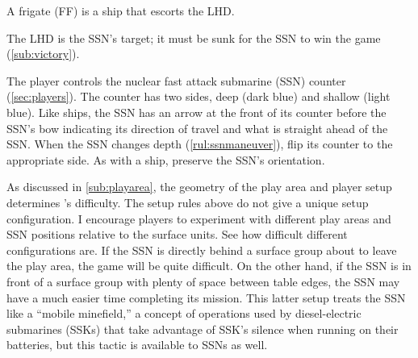 \documentclass[../TacSubMicroRules.tex]{subfiles}
\begin{document}
 A frigate (FF) is a ship that escorts the LHD.

 The LHD is the SSN's target; it must be sunk for the SSN to win the game (\ref{sub:victory}).

 The player controls the nuclear fast attack submarine (SSN) counter (\ref{sec:players}).
The counter has two sides, deep (dark blue) and shallow (light blue).
Like ships, the SSN has an arrow at the front of its counter before the SSN's bow indicating its direction of travel and what is straight ahead of the SSN.
When the SSN changes depth (\ref{rul:ssnmaneuver}), flip its counter to the appropriate side.
As with a ship, preserve the SSN's orientation.

\begin{design}
    As discussed in \ref{sub:playarea}, the geometry of the play area and player setup determines \gametitle's difficulty.
    The setup rules above do not give a unique setup configuration.
    I encourage players to experiment with different play areas and SSN positions relative to the surface units.
    See how difficult different configurations are.
    If the SSN is directly behind a surface group about to leave the play area, the game will be quite difficult.
    On the other hand, if the SSN is in front of a surface group with plenty of space between table edges, the SSN may have a much easier time completing its mission.
    This latter setup treats the SSN like a ``mobile minefield,'' a concept of operations used by diesel-electric submarines (SSKs) that take advantage of SSK's silence when running on their batteries, but this tactic is available to SSNs as well.
\end{design}
\end{document}
